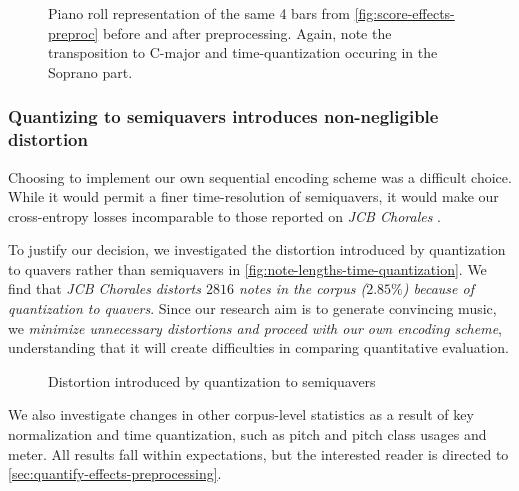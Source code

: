 
\begin{figure}[tb]
    \centering
        
        
    \caption{Piano roll representation of the same 4 bars from \cref{fig:score-effects-preproc}
      before and after preprocessing. Again, note the transposition to C-major
      and time-quantization occuring in the Soprano part.}
    \label{fig:piano-roll-effects-preproc}
\end{figure}

\subsubsection{Quantizing to semiquavers introduces non-negligible distortion}\label{sec:jcb-distorts}

Choosing to implement our own sequential encoding scheme was a difficult choice.
While it would permit a finer time-resolution of semiquavers, it would make
our cross-entropy losses incomparable to those reported on \textit{JCB
Chorales} \citep{Allan2005}.

To justify our decision, we investigated the distortion introduced by
quantization to quavers rather than semiquavers in
\vref{fig:note-lengths-time-quantization}. We find that \textit{JCB Chorales}
\emph{distorts $2816$ notes in the corpus ($2.85\%$) because of quantization to
quavers}. Since our research aim is to generate convincing music, we
\emph{minimize unnecessary distortions and proceed with our own encoding
scheme}, understanding that it will create difficulties in comparing
quantitative evaluation.

\begin{figure}[tb]
    \centering
    \begin{subfigure}[t]{0.48\textwidth}
        \centering
        
    \end{subfigure}
    \begin{subfigure}[t]{0.48\textwidth}
        \centering
        
    \end{subfigure}
    \caption{Distortion introduced by quantization to semiquavers}
    \label{fig:note-lengths-time-quantization}
\end{figure}

We also investigate changes in other corpus-level statistics as a result of key
normalization and time quantization, such as pitch and pitch class usages and
meter. All results fall within expectations, but the interested reader is
directed to \vref{sec:quantify-effects-preprocessing}.

